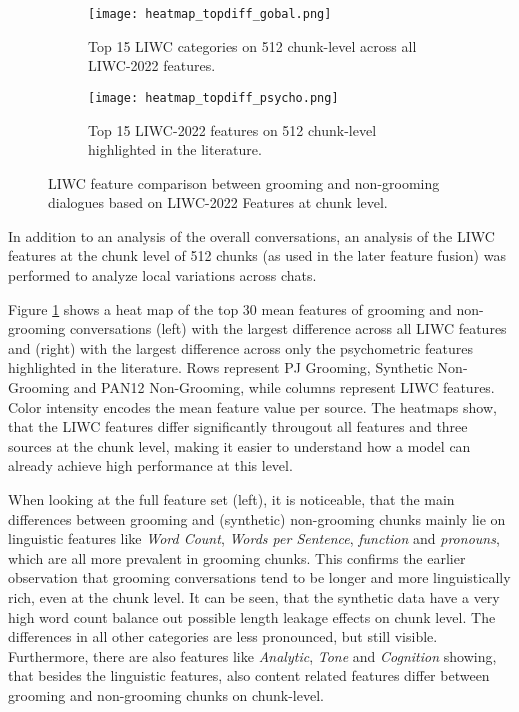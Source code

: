 
\begin{figure}[ht]
    \centering
    \begin{subfigure}[t]{0.49\textwidth}
        \centering
        \texttt{[image: heatmap\_topdiff\_gobal.png]}
        \caption{Top 15 LIWC categories on 512 chunk-level across all LIWC-2022 features.}
    \end{subfigure}
    \hfill
    \begin{subfigure}[t]{0.49\textwidth}
        \centering
        \texttt{[image: heatmap\_topdiff\_psycho.png]}
        \caption{Top 15 LIWC-2022 features on 512 chunk-level highlighted in the literature.}
    \end{subfigure}
    \caption[LIWC Feature Comparison at Chunk Level]{LIWC feature comparison between grooming and non-grooming dialogues based on LIWC-2022 Features at chunk level.}
    \label{fig:liwc_chunked_analysis}
\end{figure}

In addition to an analysis of the overall conversations, an analysis of the LIWC features at the chunk level of 512 chunks (as used in the later feature fusion) was performed to analyze local variations across chats. 

Figure \ref{fig:liwc_chunked_analysis} shows a heat map of the top 30 mean features of grooming and non-grooming conversations (left) with the largest difference across all LIWC features and (right) with the largest difference across only the psychometric features highlighted in the literature. Rows represent PJ Grooming, Synthetic Non-Grooming and PAN12 Non-Grooming, while columns represent LIWC features. Color intensity encodes the mean feature value per source. The heatmaps show, that the LIWC features differ significantly througout all features and three sources at the chunk level, making it easier to understand how a model can already achieve high performance at this level.

When looking at the full feature set (left), it is noticeable, that the main differences between grooming and (synthetic) non-grooming chunks mainly lie on linguistic features like \textit{Word Count}, \textit{Words per Sentence}, \textit{function} and \textit{pronouns}, which are all more prevalent in grooming chunks. This confirms the earlier observation that grooming conversations tend to be longer and more linguistically rich, even at the chunk level. It can be seen, that the synthetic data have a very high word count balance out possible length leakage effects on chunk level. The differences in all other categories are less pronounced, but still visible. Furthermore, there are also features like \textit{Analytic}, \textit{Tone} and \textit{Cognition} showing, that besides the linguistic features, also content related features differ between grooming and non-grooming chunks on chunk-level.

